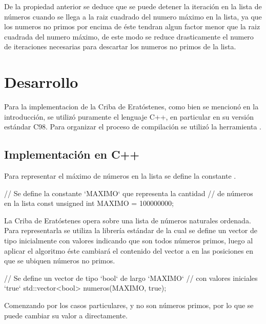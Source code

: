 \documentclass[12pt]{article}
\newenvironment{fullgrayverb}
{\verbbox}
{\endverbbox\par\colorbox{gray!25}{\parbox{\textwidth}{\theverbbox}}\par}
\begin{document}
De la propiedad anterior se deduce que se puede detener la iteración en la lista
de números cuando se llega a la raiz cuadrado del numero máximo en la lista, ya
que los numeros no primos por encima de éste tendran algun factor menor que la
raiz cuadrada del numero máximo, de este modo se reduce drasticamente el numero
de iteraciones necesarias para descartar los numeros no primos de la lista.

\section{Desarrollo}

Para la implementacion de la Criba de Eratóstenes, como bien se mencionó en la
introducción, se utilizó puramente el lenguaje C++, en particular en su versión
estándar C98. Para organizar el proceso de compilación se utilizó la herramienta
.


\subsection{Implementación en C++}

Para representar el máximo de números en la lista se define la constante
.

\begin{fullgrayverb}[\mbox{}]
// Se define la constante `MAXIMO` que representa la cantidad
// de números en la lista
const unsigned int MAXIMO = 100000000;
\end{fullgrayverb}

La Criba de Eratóstenes opera sobre una lista de números naturales ordenada.
Para representarla se utiliza la librería estándar  de la cual
se define un vector de tipo  inicialmente con valores 
indicando que son todos números primos, luego al aplicar el algoritmo éste
cambiará el contenido del vector a  en las posiciones en que se
ubiquen números no primos.

\begin{fullgrayverb}[\mbox{}]
// Se define un vector de tipo `bool` de largo `MAXIMO`
// con valores iniciales `true`
std::vector<bool> numeros(MAXIMO, true);
\end{fullgrayverb}

Comenzando por los casos particulares,  y  no son números
primos, por lo que se puede cambiar su valor a  directamente.
\end{document}
